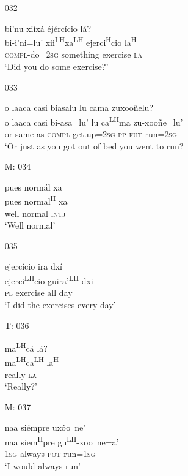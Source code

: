 \begin{itemize}
\item[032]
 
\glll   bi'nu xi\v{i}x\'{a} \'{e}j\'{e}rc\'{i}cio l\'{a}? \\
bi-i'ni=lu' xii\textsuperscript{LH}xa\textsuperscript{LH} ejerci\textsuperscript{H}cio la\textsuperscript{H} \\
\textsc{compl}-do=\textsc{2sg} something exercise \textsc{la} \\
\glt `Did you do some exercise?'
 
 

\item[033]
 
\glll   o laaca casi biasalu lu cama zuxoo\~{n}elu? \\
o laaca casi bi-asa=lu' lu ca\textsuperscript{LH}ma zu-xoo\~{n}e=lu' \\
or same as \textsc{compl}-get.up=\textsc{2sg} \textsc{pp} \textsc{fut}-run=\textsc{2sg} \\
\glt `Or just as you got out of bed you went to run?
 

\item[M: 034]
 

\glll   pues norm\'{a}l xa \\
pues normal\textsuperscript{H} xa \\
well normal \textsc{intj} \\
\glt `Well normal'
 

\item[035]
 
\glll  ejerc\'{i}cio ira dx\'{i} \\
  ejerci\textsuperscript{LH}cio guira'\textsuperscript{LH} dxi \\
 \textsc{pl} exercise all day \\
\glt `I did the exercises every day'
 


\item[T: 036]
  
\glll   ma\textsuperscript{LH}c\'{a} l\'{a}? \\
ma\textsuperscript{LH}ca\textsuperscript{LH} la\textsuperscript{H} \\
really \textsc{la} \\
\glt `Really?'
  

\item[M: 037]
 
\glll   naa si\'{e}mpre ux\'{o}o~{n}e' \\
naa siem\textsuperscript{H}pre gu\textsuperscript{LH}-xoo~{n}e=a' \\
\textsc{1sg} always \textsc{pot}-run=\textsc{1sg} \\
\glt `I would always run'
 


\end{itemize}
